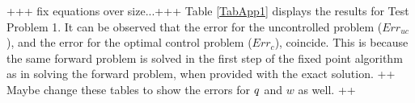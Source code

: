 +++ fix equations over size...+++
Table \ref{TabApp1} displays the results for Test Problem 1. It can be observed that the error for the uncontrolled problem ($Err_{uc}$), and the error for the optimal control problem ($Err_c$), coincide. This is because the same forward problem is solved in the first step of the fixed point algorithm as in solving the forward problem, when provided with the exact solution. 
++ Maybe change these tables to show the errors for $q$ and $w$ as well. ++


%




\vspace{0.75em}

